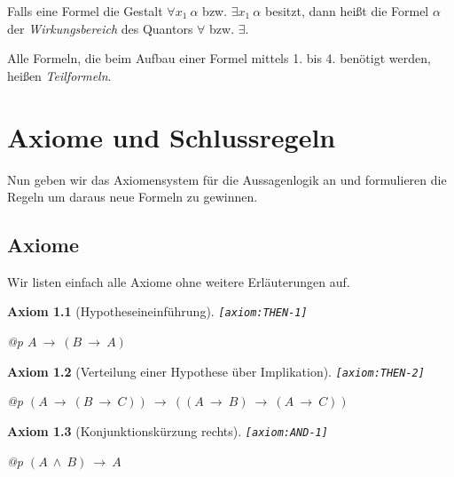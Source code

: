 \documentclass[a4paper,german,10pt,twoside]{book}
\newtheorem{ax}{Axiom}
\theoremstyle{definition}
\theoremstyle{remark}
\begin{document}
\par
Falls eine Formel die Gestalt $\forall x_1 ~ \alpha$ bzw. $\exists x_1 ~ \alpha$ besitzt, dann hei{\ss}t die Formel $\alpha$ der
\emph{Wirkungsbereich} des Quantors $\forall$ bzw. $\exists$.

\par
Alle Formeln, die beim Aufbau einer Formel mittels 1. bis 4. ben{\"o}tigt werden, hei{\ss}en \emph{Teilformeln}.



\chapter{Axiome und Schlussregeln} \label{chapter3} \hypertarget{chapter3}{}

Nun geben wir das Axiomensystem f{\"u}r die Aussagenlogik an und formulieren die Regeln um daraus neue Formeln zu gewinnen.

\section{Axiome} \label{chapter3_section1} \hypertarget{chapter3_section1}{}
Wir listen einfach alle Axiome ohne weitere Erl{\"a}uterungen auf.

\begin{ax}[Hypotheseineinf{\"u}hrung]
\label{axiom:THEN-1} \hypertarget{axiom:THEN-1}{}
{\tt \tiny [\verb]axiom:THEN-1]]}
\mbox{}
\begin{longtable}{{@{\extracolsep{\fill}}p{\linewidth}}}
\centering $A\ \rightarrow\ (B\ \rightarrow\ A)$
\end{longtable}

\end{ax}


\begin{ax}[Verteilung einer Hypothese {\"u}ber Implikation]
\label{axiom:THEN-2} \hypertarget{axiom:THEN-2}{}
{\tt \tiny [\verb]axiom:THEN-2]]}
\mbox{}
\begin{longtable}{{@{\extracolsep{\fill}}p{\linewidth}}}
\centering $(A\ \rightarrow\ (B\ \rightarrow\ C))\ \rightarrow\ ((A\ \rightarrow\ B)\ \rightarrow\ (A\ \rightarrow\ C))$
\end{longtable}

\end{ax}


\begin{ax}[Konjunktionsk{\"u}rzung rechts]
\label{axiom:AND-1} \hypertarget{axiom:AND-1}{}
{\tt \tiny [\verb]axiom:AND-1]]}
\mbox{}
\begin{longtable}{{@{\extracolsep{\fill}}p{\linewidth}}}
\centering $(A\ \land\ B)\ \rightarrow\ A$
\end{longtable}

\end{ax}
\end{document}
